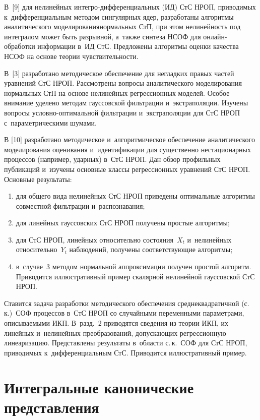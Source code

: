 \begin{multicols}{2}
В~[9] для нелинейных ин\-тег\-ро-диф\-фе\-рен\-ци\-аль\-ных (ИД) СтС НРОП, 
приводимых к~дифференциальным методом 
сингулярных ядер, разработаны алгоритмы аналитического моделирования\linebreak нормальных 
СтП, при этом нелинейность под интегралом может быть разрывной, а~также синтеза 
НСОФ для он\-лайн-об\-ра\-бот\-ки информации в~ИД СтС. Предложены алгоритмы оценки 
качества НСОФ на основе теории чув\-ст\-ви\-тель\-ности.

В~[3] разработано методическое обеспечение для негладких правых частей уравнений 
СтС НРОП. Рассмотрены вопросы аналитического моделирования нормальных СтП на 
основе нелинейных регрессионных моделей. Особое внимание уделено методам 
гауссовской фильтрации и~экстраполяции. Изучены вопросы условно-оптимальной 
фильтрации и~экстраполяции для СтС НРОП с~параметрическими шумами.

В [10] разработано методическое и~алгоритмическое обеспечение аналитического 
моделирования оценивания и~идентификации для существенно нестационарных 
процессов (например, ударных) в~СтС НРОП. Дан обзор профильных публикаций 
и~изучены основные классы регрессионных уравнений СтС НРОП. Основные результаты: 
\begin{enumerate}[(1)]
\item для общего вида нелинейных СтС НРОП приведены оптимальные алгоритмы 
совместной фильтрации и~распознавания; 
\item для линейных гауссовских СтС НРОП 
получены простые алгоритмы; 
\item для СтС НРОП, линейных относительно состояния~$X_t$ 
и~нелинейных относительно~$Y_t$ наблюдений, получены соответствующие  
алгоритмы; 
\item в~случае~3 методом нормальной аппроксимации получен простой 
алгоритм. Приводится иллюстративный пример скалярной нелинейной гауссовской СтС 
НРОП.
\end{enumerate}

Ставится задача разработки методического обеспечения среднеквадратичной (с.\,к.)\ 
СОФ процессов в~СтС НРОП со случайными переменными 
параметрами, описываемыми ИКП. В~разд.~2 приводятся сведения из теории ИКП, их 
линейных и~нелинейных преобразований, допускающих регрессионную линеаризацию. 
Представлены результаты в~области с.\,к.\ СОФ для СтС НРОП, приводимых 
к~дифференциальным СтС. Приводится иллюстративный пример.


\section{Интегральные канонические представления}


\end{multicols}
